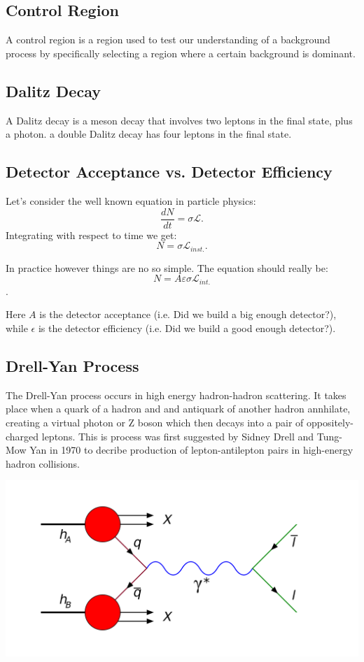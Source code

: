 \documentclass{article}
\begin{document}
\subsection{Control Region}
A control region is a region used to test our understanding of a background process by specifically selecting a region where a certain background is dominant.
\subsection{Dalitz Decay}
A Dalitz decay is a meson decay that involves two leptons in the final state, plus a photon. a double Dalitz decay has four leptons in the final state.
\subsection{Detector Acceptance vs. Detector Efficiency}
Let's consider the well known equation in particle physics:
$$ \frac{dN}{dt} = \sigma \mathcal{L}.$$
Integrating with respect to time we get:
$$N = \sigma \mathcal{L}_{inst.}.$$

In practice however things are no so simple. The equation should really be:
$$ N = A \varepsilon \sigma \mathcal{L}_{int.}$$.

Here $A$ is the detector acceptance (i.e. Did we build a big enough detector?), while $\epsilon$ is the detector efficiency (i.e. Did we build a good enough detector?).
\subsection{Drell-Yan Process}

The Drell-Yan process occurs in high energy hadron-hadron scattering. It takes place when a quark of a hadron and and antiquark of another hadron annhilate, creating a virtual photon or Z boson which then decays into a pair of oppositely-charged leptons. This is process was first suggested by Sidney Drell and Tung-Mow Yan in 1970 to decribe production of lepton-antilepton pairs in high-energy hadron collisions.

\centerline{\includegraphics[scale=0.25]{1024px-Drell-Yan.png}}
\end{document}
